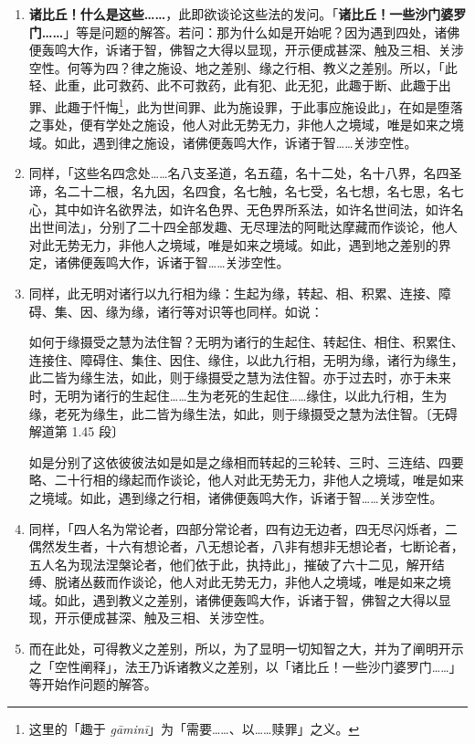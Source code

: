 \begin{enumerate}
\item \textbf{诸比丘！什么是这些……}，此即欲谈论这些法的发问。「\textbf{诸比丘！一些沙门婆罗门……}」等是问题的解答。若问：那为什么如是开始呢？因为遇到四处，诸佛便轰鸣大作，诉诸于智，佛智之大得以显现，开示便成甚深、触及三相、关涉空性。何等为四？律之施设、地之差别、缘之行相、教义之差别。所以，「此轻、此重，此可救药、此不可救药，此有犯、此无犯，此趣于断、此趣于出罪、此趣于忏悔\footnote{这里的「趣于 \textit{gāminī}」为「需要……、以……赎罪」之义。}，此为世间罪、此为施设罪，于此事应施设此」，在如是堕落之事处，便有学处之施设，他人对此无势无力，非他人之境域，唯是如来之境域。如此，遇到律之施设，诸佛便轰鸣大作，诉诸于智……关涉空性。
\item 同样，「这些名四念处……名八支圣道，名五蕴，名十二处，名十八界，名四圣谛，名二十二根，名九因，名四食，名七触，名七受，名七想，名七思，名七心，其中如许名欲界法，如许名色界、无色界所系法，如许名世间法，如许名出世间法」，分别了二十四全部发趣、无尽理法的阿毗达摩藏而作谈论，他人对此无势无力，非他人之境域，唯是如来之境域。如此，遇到地之差别的界定，诸佛便轰鸣大作，诉诸于智……关涉空性。
\item 同样，此无明对诸行以九行相为缘：生起为缘，转起、相、积累、连接、障碍、集、因、缘为缘，诸行等对识等也同样。如说：\begin{quoting}如何于缘摄受之慧为法住智？无明为诸行的生起住、转起住、相住、积累住、连接住、障碍住、集住、因住、缘住，以此九行相，无明为缘，诸行为缘生，此二皆为缘生法，如此，则于缘摄受之慧为法住智。亦于过去时，亦于未来时，无明为诸行的生起住……生为老死的生起住……缘住，以此九行相，生为缘，老死为缘生，此二皆为缘生法，如此，则于缘摄受之慧为法住智。{\bluefootnotesize 〔无碍解道第 1.45 段〕}\end{quoting}如是分别了这依彼彼法如是如是之缘相而转起的三轮转、三时、三连结、四要略、二十行相的缘起而作谈论，他人对此无势无力，非他人之境域，唯是如来之境域。如此，遇到缘之行相，诸佛便轰鸣大作，诉诸于智……关涉空性。
\item 同样，「四人名为常论者，四部分常论者，四有边无边者，四无尽闪烁者，二偶然发生者，十六有想论者，八无想论者，八非有想非无想论者，七断论者，五人名为现法涅槃论者，他们依于此，执持此」，摧破了六十二见，解开结缚、脱诸丛薮而作谈论，他人对此无势无力，非他人之境域，唯是如来之境域。如此，遇到教义之差别，诸佛便轰鸣大作，诉诸于智，佛智之大得以显现，开示便成甚深、触及三相、关涉空性。
\item 而在此处，可得教义之差别，所以，为了显明一切知智之大，并为了阐明开示之「空性阐释」，法王乃诉诸教义之差别，以「诸比丘！一些沙门婆罗门……」等开始作问题的解答。\end{enumerate}

